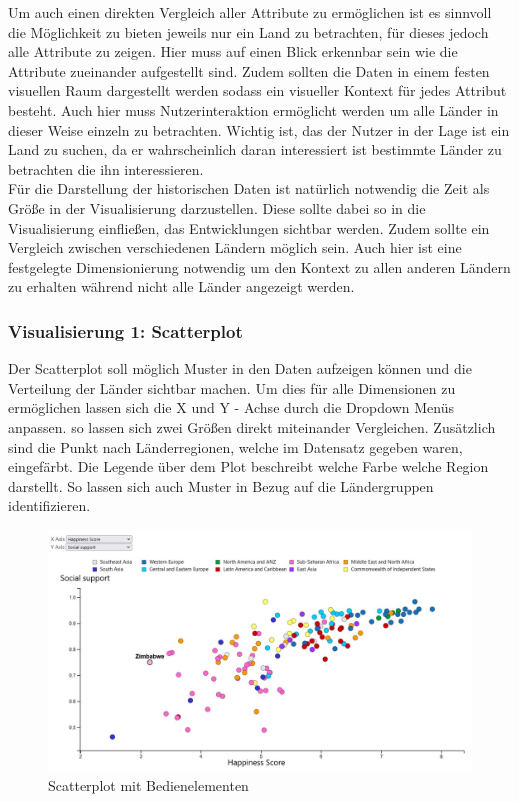 Um auch einen direkten Vergleich aller Attribute zu ermöglichen ist es sinnvoll die Möglichkeit zu bieten jeweils nur ein Land zu betrachten, für dieses jedoch alle Attribute zu zeigen. Hier muss auf einen Blick erkennbar sein wie die Attribute zueinander aufgestellt sind. Zudem sollten die Daten in einem festen visuellen Raum dargestellt werden sodass ein visueller Kontext für jedes Attribut besteht. Auch hier muss Nutzerinteraktion ermöglicht werden um alle Länder in dieser Weise einzeln zu betrachten. Wichtig ist, das der Nutzer in der Lage ist ein Land zu suchen, da er wahrscheinlich daran interessiert ist bestimmte Länder zu betrachten die ihn interessieren.\\

Für die Darstellung der historischen Daten ist natürlich notwendig die Zeit als Größe in der Visualisierung darzustellen. Diese sollte dabei so in die Visualisierung einfließen, das Entwicklungen sichtbar werden. Zudem sollte ein Vergleich zwischen verschiedenen Ländern möglich sein. Auch hier ist eine festgelegte Dimensionierung notwendig um den Kontext zu allen anderen Ländern zu erhalten während nicht alle Länder angezeigt werden.  

\subsubsection{Visualisierung 1: Scatterplot}

Der Scatterplot soll möglich Muster in den Daten aufzeigen können und die Verteilung der Länder sichtbar machen. Um dies für alle Dimensionen zu ermöglichen lassen sich die X und Y - Achse durch die Dropdown Menüs anpassen. so lassen sich zwei Größen direkt miteinander Vergleichen. Zusätzlich sind die Punkt nach Länderregionen, welche im Datensatz gegeben waren, eingefärbt. Die Legende über dem Plot beschreibt welche Farbe welche Region darstellt. So lassen sich auch Muster in Bezug auf die Ländergruppen identifizieren. \\

\begin{figure}[h]
 \centering
 \includegraphics[width = \textwidth]{img/scatterplot.jpg}
 \caption{Scatterplot mit Bedienelementen}
 \label{fig:scatterplot}
\end{figure}
\vspace{0.5cm}

